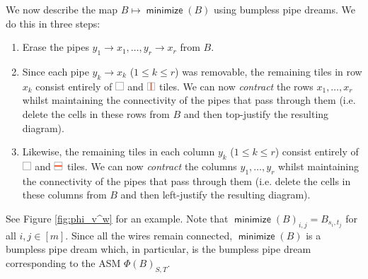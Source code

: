 \documentclass[11pt]{article}
\theoremstyle{definition}
\numberwithin{equation}{section}
\DeclareMathOperator{\minimize}{\mathsf{minimize}}
\newcommand{\pipecolor}{UForange}
\newcommand{\tilescale}{0.27}
\newcommand{\drawSquare}{
    \draw[
        xshift=0.5cm,yshift=0.5cm,
        black,opacity=0.5,thin
    ] (0,0) rectangle (1,1);
}
\newcommand{\drawHorizontal}[2]{
    \draw[color=\pipecolor,very thick]
    (#1-0.5,#2) to (#1+0.5,#2);
}
\newcommand{\drawVertical}[2]{
    \draw[color=\pipecolor,very thick]
    (#1,#2-0.5) to (#1,#2+0.5);
}
\newcommand{\blank}[1][scale=\tilescale,baseline=4pt]{
    \begin{tikzpicture}[#1]
    \drawSquare
    \end{tikzpicture}
}
\newcommand{\horizontal}[1][scale=\tilescale,baseline=4pt]{
    \begin{tikzpicture}[#1]
    \drawSquare
    \drawHorizontal11
    \end{tikzpicture}
}
\newcommand{\vertical}[1][scale=\tilescale,baseline=4pt]{
    \begin{tikzpicture}[#1]
    \drawSquare
    \drawVertical11
    \end{tikzpicture}
}
\begin{document}
We now describe the map $B\mapsto \minimize(B)$ using bumpless pipe dreams.
We do this in three steps:
\begin{enumerate}
    \item Erase the pipes $y_1\to x_1,\dots,y_r\to x_r$ from $B$.
    \item Since each pipe $y_k\to x_k$ ($1\leq k\leq r$) was removable, the remaining tiles in row $x_k$ consist entirely of $\blank$ and $\vertical$ tiles.
    We can now \textit{contract} the rows $x_1,\dots,x_r$ whilst maintaining the connectivity of the pipes that pass through them
    (i.e. delete the cells in these rows from $B$ and then top-justify the resulting diagram).
    \item Likewise, the remaining tiles in each column $y_k$ ($1\leq k\leq r$) consist entirely of $\blank$ and $\horizontal$ tiles.
    We can now \textit{contract} the columns $y_1,\dots,y_r$ whilst maintaining the connectivity of the pipes that pass through them
    (i.e. delete the cells in these columns from $B$ and then left-justify the resulting diagram).
\end{enumerate}
See Figure \ref{fig:phi_v^w} for an example.
Note that $\minimize(B)_{i,j} = B_{s_i,t_j}$ for all $i,j\in[m]$.
Since all the wires remain connected, $\minimize(B)$ is a bumpless pipe dream which, in particular, is the bumpless pipe dream corresponding to the ASM $\Phi(B)_{S,T}$.
\end{document}
